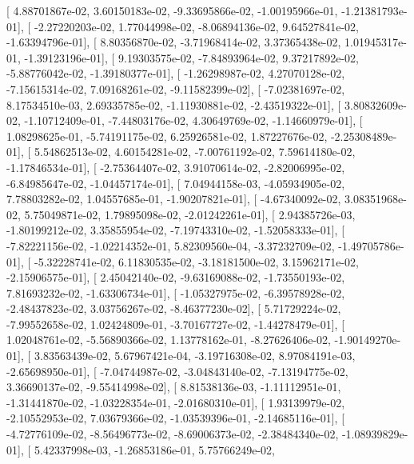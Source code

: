 \documentclass{article}
\begin{document}
       [  4.88701867e-02,   3.60150183e-02,  -9.33695866e-02,
         -1.00195966e-01,  -1.21381793e-01],
       [ -2.27220203e-02,   1.77044998e-02,  -8.06894136e-02,
          9.64527841e-02,  -1.63394796e-01],
       [  8.80356870e-02,  -3.71968414e-02,   3.37365438e-02,
          1.01945317e-01,  -1.39123196e-01],
       [  9.19303575e-02,  -7.84893964e-02,   9.37217892e-02,
         -5.88776042e-02,  -1.39180377e-01],
       [ -1.26298987e-02,   4.27070128e-02,  -7.15615314e-02,
          7.09168261e-02,  -9.11582399e-02],
       [ -7.02381697e-02,   8.17534510e-03,   2.69335785e-02,
         -1.11930881e-02,  -2.43519322e-01],
       [  3.80832609e-02,  -1.10712409e-01,  -7.44803176e-02,
          4.30649769e-02,  -1.14660979e-01],
       [  1.08298625e-01,  -5.74191175e-02,   6.25926581e-02,
          1.87227676e-02,  -2.25308489e-01],
       [  5.54862513e-02,   4.60154281e-02,  -7.00761192e-02,
          7.59614180e-02,  -1.17846534e-01],
       [ -2.75364407e-02,   3.91070614e-02,  -2.82006995e-02,
         -6.84985647e-02,  -1.04457174e-01],
       [  7.04944158e-03,  -4.05934905e-02,   7.78803282e-02,
          1.04557685e-01,  -1.90207821e-01],
       [ -4.67340092e-02,   3.08351968e-02,   5.75049871e-02,
          1.79895098e-02,  -2.01242261e-01],
       [  2.94385726e-03,  -1.80199212e-02,   3.35855954e-02,
         -7.19743310e-02,  -1.52058333e-01],
       [ -7.82221156e-02,  -1.02214352e-01,   5.82309560e-04,
         -3.37232709e-02,  -1.49705786e-01],
       [ -5.32228741e-02,   6.11830535e-02,  -3.18181500e-02,
          3.15962171e-02,  -2.15906575e-01],
       [  2.45042140e-02,  -9.63169088e-02,  -1.73550193e-02,
          7.81693232e-02,  -1.63306734e-01],
       [ -1.05327975e-02,  -6.39578928e-02,  -2.48437823e-02,
          3.03756267e-02,  -8.46377230e-02],
       [  5.71729224e-02,  -7.99552658e-02,   1.02424809e-01,
         -3.70167727e-02,  -1.44278479e-01],
       [  1.02048761e-02,  -5.56890366e-02,   1.13778162e-01,
         -8.27626406e-02,  -1.90149270e-01],
       [  3.83563439e-02,   5.67967421e-04,  -3.19716308e-02,
          8.97084191e-03,  -2.65698950e-01],
       [ -7.04744987e-02,  -3.04843140e-02,  -7.13194775e-02,
          3.36690137e-02,  -9.55414998e-02],
       [  8.81538136e-03,  -1.11112951e-01,  -1.31441870e-02,
         -1.03228354e-01,  -2.01680310e-01],
       [  1.93139979e-02,  -2.10552953e-02,   7.03679366e-02,
         -1.03539396e-01,  -2.14685116e-01],
       [ -4.72776109e-02,  -8.56496773e-02,  -8.69006373e-02,
         -2.38484340e-02,  -1.08939829e-01],
       [  5.42337998e-03,  -1.26853186e-01,   5.75766249e-02,
\end{document}
